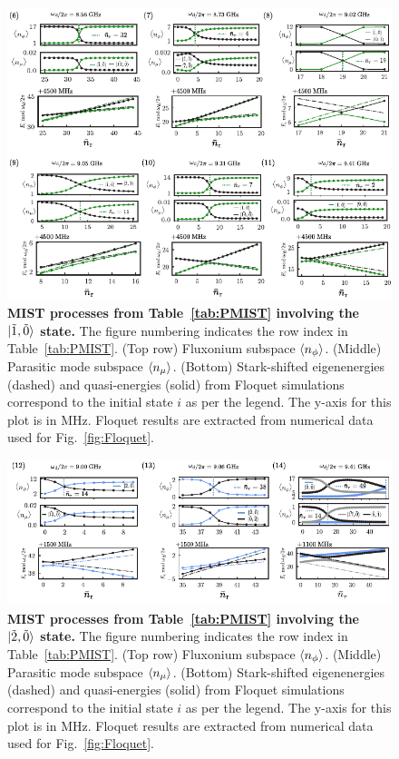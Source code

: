\documentclass[%
reprint,
superscriptaddress,
 amsmath,amssymb,
 aps,
 prx,
longbibliography,
floatfix,
]{revtex4-2}
\begin{document}
\begin{figure}
    \centering
    \includegraphics[width=1.0\textwidth]{Supp_Fig/Trans1.pdf}
    \caption{\textbf{MIST processes from Table~\ref{tab:PMIST} involving the $\ket{\tilde{1},\tilde{0}}$ state.} The figure numbering indicates the row index in Table~\ref{tab:PMIST}. (Top row) Fluxonium subspace $\braket{n_\phi}$. (Middle) Parasitic mode subspace $\braket{n_\mu}$. (Bottom) Stark-shifted eigenenergies (dashed) and quasi-energies (solid) from Floquet simulations correspond to the initial state $i$ as per the legend. The y-axis for this plot is in MHz. Floquet results are extracted from numerical data used for Fig.~\ref{fig:Floquet}.}
    \label{fig:Trans1}
\end{figure}
\begin{figure}
    \centering
    \includegraphics[width=1.0\textwidth]{Supp_Fig/Trans2.pdf}
    \caption{\textbf{MIST processes from Table~\ref{tab:PMIST} involving the $\ket{\tilde{2},\tilde{0}}$ state.} The figure numbering indicates the row index in Table~\ref{tab:PMIST}. (Top row) Fluxonium subspace $\braket{n_\phi}$. (Middle) Parasitic mode subspace $\braket{n_\mu}$. (Bottom) Stark-shifted eigenenergies (dashed) and quasi-energies (solid) from Floquet simulations correspond to the initial state $i$ as per the legend. The y-axis for this plot is in MHz. Floquet results are extracted from numerical data used for Fig.~\ref{fig:Floquet}.}
    \label{fig:Trans2}
\end{figure}
\clearpage
 
\end{document}
